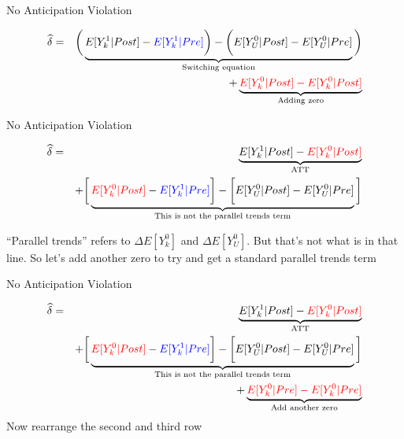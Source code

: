 \documentclass{beamer}
\begin{document}
\begin{frame}{No Anticipation Violation}

\begin{eqnarray*}
\widehat{\delta} &=& \bigg ( \underbrace{E[Y^1_k|Post] - \textcolor{blue}{E[Y^1_k|Pre] }\bigg ) - \bigg ( E[Y^0_U | Post ] - E[ Y^0_U | Pre]}_{\mathclap{\text{Switching equation}}} \bigg)  \\
&&+ \underbrace{\textcolor{red}{E[Y_k^0 |Post] - E[Y^0_k | Post]}}_{\mathclap{\text{Adding zero}}} 
\end{eqnarray*}


\end{frame}

\begin{frame}{No Anticipation Violation}

\begin{eqnarray*}
\widehat{\delta} &=& \underbrace{E[Y^1_k | Post] - \textcolor{red}{E[Y^0_k | Post]}}_{\mathclap{\text{ATT}}} \\
&& + \bigg [  \underbrace{\textcolor{red}{E[Y^0_k | Post]} - \textcolor{blue}{E[Y^1_k | Pre]} \bigg ] - \bigg [ \textcolor{black}{E[Y^0_U | Post]} - E[Y_U^0 | Pre] }_{\mathclap{\text{This is not the parallel trends term}}} \bigg ]
\end{eqnarray*}

``Parallel trends'' refers to  $\Delta E[Y^0_k]$ and $\Delta E[Y^0_U]$.  But that's not what is in that line.  So let's add another zero to try and get a standard parallel trends term

\end{frame}

\begin{frame}{No Anticipation Violation}

\begin{eqnarray*}
\widehat{\delta} &=& \underbrace{E[Y^1_k | Post] - \textcolor{red}{E[Y^0_k | Post]}}_{\mathclap{\text{ATT}}} \\
&& + \bigg [  \underbrace{\textcolor{red}{E[Y^0_k | Post]} - \textcolor{blue}{E[Y^1_k | Pre]} \bigg ] - \bigg [ \textcolor{black}{E[Y^0_U | Post]} - E[Y_U^0 | Pre] }_{\mathclap{\text{This is not the parallel trends term}}} \bigg ] \\
&& + \underbrace{ \textcolor{red}{E[Y^0_k|Pre] - E[Y^0_k|Pre]}}_{\mathclap{\text{Add another zero}}}
\end{eqnarray*} Now rearrange the second and third row

\end{frame}
\end{document}
